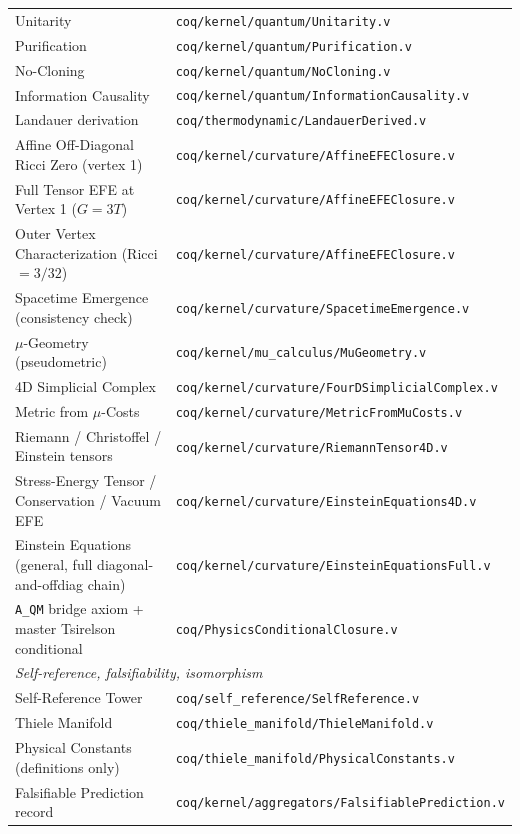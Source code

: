 \documentclass[11pt, a4paper]{report}
\theoremstyle{definition}
\theoremstyle{plain}
\begin{document}
\begin{center}
\begin{tabular}{ll}
Unitarity & \texttt{coq/kernel/quantum/Unitarity.v} \\
Purification & \texttt{coq/kernel/quantum/Purification.v} \\
No-Cloning & \texttt{coq/kernel/quantum/NoCloning.v} \\
Information Causality & \texttt{coq/kernel/quantum/InformationCausality.v} \\
Landauer derivation & \texttt{coq/thermodynamic/LandauerDerived.v} \\
Affine Off-Diagonal Ricci Zero (vertex 1) & \texttt{coq/kernel/curvature/AffineEFEClosure.v} \\
Full Tensor EFE at Vertex 1 ($G = 3T$) & \texttt{coq/kernel/curvature/AffineEFEClosure.v} \\
Outer Vertex Characterization (Ricci $= 3/32$) & \texttt{coq/kernel/curvature/AffineEFEClosure.v} \\
Spacetime Emergence (consistency check) & \texttt{coq/kernel/curvature/SpacetimeEmergence.v} \\
$\mu$-Geometry (pseudometric) & \texttt{coq/kernel/mu\_calculus/MuGeometry.v} \\
4D Simplicial Complex & \texttt{coq/kernel/curvature/FourDSimplicialComplex.v} \\
Metric from $\mu$-Costs & \texttt{coq/kernel/curvature/MetricFromMuCosts.v} \\
Riemann / Christoffel / Einstein tensors & \texttt{coq/kernel/curvature/RiemannTensor4D.v} \\
Stress-Energy Tensor / Conservation / Vacuum EFE & \texttt{coq/kernel/curvature/EinsteinEquations4D.v} \\
Einstein Equations (general, full diagonal-and-offdiag chain) & \texttt{coq/kernel/curvature/EinsteinEquationsFull.v} \\
\texttt{A\_QM} bridge axiom + master Tsirelson conditional & \texttt{coq/PhysicsConditionalClosure.v} \\
\hline
\multicolumn{2}{l}{\emph{Self-reference, falsifiability, isomorphism}} \\
\hline
Self-Reference Tower & \texttt{coq/self\_reference/SelfReference.v} \\
Thiele Manifold & \texttt{coq/thiele\_manifold/ThieleManifold.v} \\
Physical Constants (definitions only) & \texttt{coq/thiele\_manifold/PhysicalConstants.v} \\
Falsifiable Prediction record & \texttt{coq/kernel/aggregators/FalsifiablePrediction.v} \\

\end{tabular}
\end{center}
\end{document}
